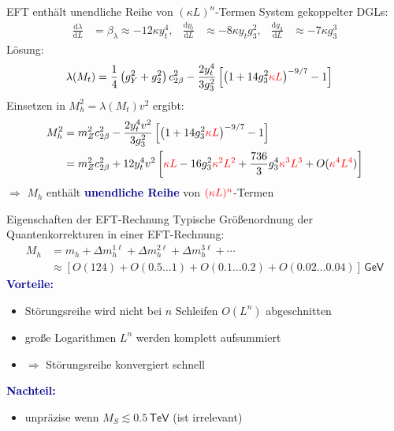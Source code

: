 \documentclass[hyperref={pdfpagelabels=false},ngerman]{beamer}
\newcommand{\eh}[1]{\,\mathsf{#1}}
\newcommand{\MS}{\ensuremath{M_S}}
\renewcommand{\emph}[1]{\textbf{\textcolor{darkblue}{#1}}}
\newcommand{\dd}{\text{d}}
\newcommand{\TeV}{\eh{TeV}}
\begin{document}
\begin{frame}{EFT enthält unendliche Reihe von $(\kappa L)^n$-Termen}
  System gekoppelter DGLs:
  \begin{align*}
    \frac{\dd\lambda}{\dd L} &= \beta_\lambda \approx -12 \kappa y_t^4 , &
    \frac{\dd y_t}{\dd L} &\approx -8 \kappa y_t g_3^2 , &
    \frac{\dd g_3}{\dd L} &\approx -7 \kappa g_3^3
  \end{align*}
  Lösung:
  \begin{align*}
    \lambda(M_t) &= \frac{1}{4}\left(g_Y^{2} + g_2^2\right) c^2_{2\beta} %
                   - \frac{2 y_t^4}{3 g_3^2} \left[
                   \left( 1 + 14 g_3^2 \textcolor{red}{\kappa L} \right)^{-9/7} - 1
    \right]
  \end{align*}
  Einsetzen in $M_h^2 = \lambda(M_t) v^2$ ergibt:
  \begin{align*}
    M_h^2 &= m_Z^2 c^2_{2\beta}
            - \frac{2 y_t^4 v^2}{3 g_3^2} \left[
            \left( 1 + 14 g_3^2 \textcolor{red}{\kappa L} \right)^{-9/7} - 1
            \right]\\
          &= m_Z^2 c^2_{2\beta}
            + 12 y_t^4 v^2 \left[
            \textcolor{red}{\kappa L}
            - 16 g_3^2 \textcolor{red}{\kappa^2 L^2}
            + \frac{736}{3} g_3^4 \textcolor{red}{\kappa^3 L^3} + O(\textcolor{red}{\kappa^4L^4})
            \right]
  \end{align*}
  $\Rightarrow$ $M_h$ enthält \emph{unendliche Reihe} von $\textcolor{red}{(\kappa L)^n}$-Termen
\end{frame}

\begin{frame}{Eigenschaften der EFT-Rechnung}
  Typische Größenordnung der Quantenkorrekturen in einer EFT-Rechnung:
  \begin{align*}
    M_h &= m_h + \Delta m_h^{1\ell} + \Delta m_h^{2\ell} + \Delta m_h^{3\ell} + \cdots \\
    &\approx [O(124) + O(0.5\ldots 1) + O(0.1\ldots 0.2) + O(0.02\ldots 0.04)] \eh{GeV}
  \end{align*}
  \emph{Vorteile:}
  \begin{itemize}
  \item Störungsreihe wird nicht bei $n$ Schleifen $O(L^n)$
    abgeschnitten
  \item große Logarithmen $L^n$ werden komplett aufsummiert
  \item $\Rightarrow$ Störungsreihe konvergiert schnell
  \end{itemize}
  \vspace*{1em}
  \emph{Nachteil:}
  \begin{itemize}
  \item unpräzise wenn  $\MS \lesssim 0.5\TeV$
    (ist irrelevant)
  \end{itemize}
\end{frame}
\end{document}
